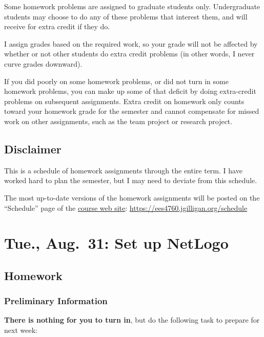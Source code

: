 \documentclass[
]{article}
\begin{document}
Some homework problems are assigned to graduate students only.
Undergraduate students may choose to do any of these problems that
interest them, and will receive for extra credit if they do.

I assign grades based on the required work, so your grade will not be
affected by whether or not other students do extra credit problems (in
other words, I never curve grades downward).

If you did poorly on some homework problems, or did not turn in some
homework problems, you can make up some of that deficit by doing
extra-credit problems on subsequent assignments. Extra credit on
homework only counts toward your homework grade for the semester and
cannot compensate for missed work on other assignments, such as the team
project or research project.

\hypertarget{disclaimer}{%
\subsection{Disclaimer}\label{disclaimer}}

This is a schedule of homework assignments through the entire term. I
have worked hard to plan the semester, but I may need to deviate from
this schedule.

The most up-to-date versions of the homework assignments will be posted
on the ``Schedule'' page of the
\href{https://ees4760.jgilligan.org/schedule}{course web site}:
\url{https://ees4760.jgilligan.org/schedule}

\hypertarget{tue.-aug.-31-set-up-netlogo}{%
\section{Tue., Aug.~31: Set up
NetLogo}\label{tue.-aug.-31-set-up-netlogo}}

\hypertarget{homework}{%
\subsection{Homework}\label{homework}}

\hypertarget{preliminary-information}{%
\subsubsection{Preliminary Information}\label{preliminary-information}}

\textbf{There is nothing for you to turn in}, but do the following task
to prepare for next week:
\end{document}
